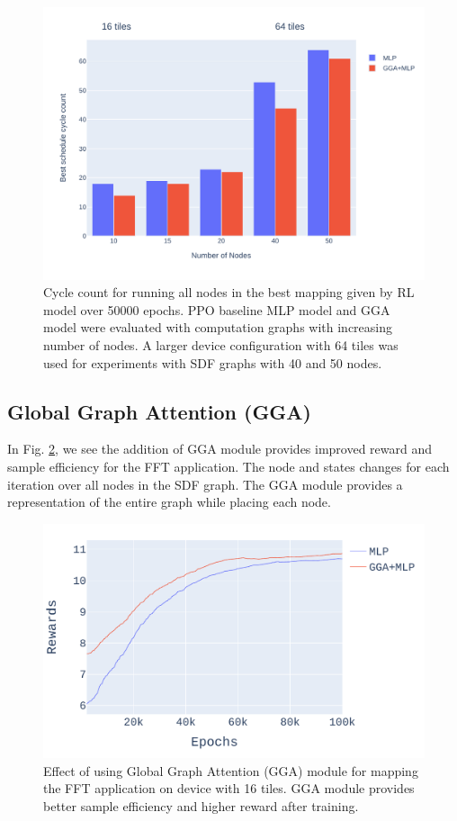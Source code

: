 \begin{figure}[h]
  \centering
  \includegraphics[width=\linewidth]{fig/nodes_graph.pdf}
  \caption{Cycle count for running all nodes in the best mapping given by RL model over 50000 epochs. 
  PPO baseline MLP model and GGA model were evaluated with computation graphs with increasing number of nodes. 
  A larger device configuration with 64 tiles was used for experiments with SDF graphs with 40 and 50 nodes. }
  \label{fig:nodes_graph}
\end{figure}


\subsection{Global Graph Attention (GGA)} \label{sec:GGA_result}

In Fig. \ref{fig:FFT_rewards}, we see the addition of GGA module provides improved reward and sample efficiency for the FFT application. 
The node and states changes for each iteration over all nodes in the SDF graph. The GGA module provides a representation of the entire graph while placing each node.

\begin{figure}[h]
  \centering
  \includegraphics[width=\linewidth]{fig/plot_gnn_atten_ppo.pdf}
  \caption{Effect of using Global Graph Attention (GGA) module for mapping the FFT application on device with 16 tiles. 
  GGA module provides better sample efficiency and higher reward after training. }
  \label{fig:FFT_rewards}
\end{figure}


